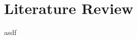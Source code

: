 
\chapter{Literature Review}

asdf
\ql{}~\cite{schafer_algebraic_2017}




\ql{}~\cite{schafer_algebraic_2017}

\cite{avgustinov_ql:_2016}

